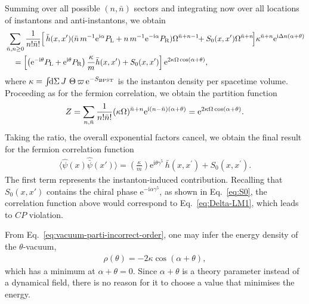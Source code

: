 \documentclass[review]{elsarticle}
\numberwithin{equation}{section}
\numberwithin{table}{section}
\numberwithin{figure}{section}
\def\i{\mathrm{i}}
\def\e{\mathrm{e}}
\begin{document}
Summing over all possible $(n,\bar n)$ sectors and integrating now over all locations of instantons and anti-instantons, we obtain 
\begin{align}
    &\sum\limits_{\bar n,n\geq 0}\frac{1}{n!\bar n!} \Big[ {\,\bar h(x,x^\prime)}(\bar n\, m^{-1} {\rm e}^{{\rm i}\alpha} P_{\rm L}+n\, m^{-1} {\rm e}^{-{\rm i}\alpha} P_{\rm R}) \Omega^{\bar n+n -1} \!\!+ S_{0}(x,x^\prime) \Omega^{\bar n+n}\! \Big] \kappa^{\bar n +n} {\rm e}^{{\rm i}\Delta n(\alpha + \theta)} \notag\\
    &\quad=\left[\left({\rm e}^{-\i\theta} P_{\rm L}+{\rm e}^{{\rm i}\theta}  P_{\rm R}\right)\frac{  \kappa}{m}\bar h(x,x^\prime) + S_{0}(x,x^\prime)\right]{\rm e}^{2\kappa \Omega\cos(\alpha+\theta)}, 
    \label{eq:fermion-two-point-incorrect-order}
\end{align}
where $\kappa={\textstyle\int}\!{\rm d}\Sigma\,J\,
\,\Theta\,\varpi\,{\rm e}^{-S_{\rm BPST}}
$ is the instanton density per spacetime volume.
Proceeding as for the fermion correlation, we obtain the partition function
\begin{align}
    Z = \sum_{n,\bar n}\frac{1}{n!\bar n!}(\kappa \Omega)^{\bar n+n}{ \rm e}^{{\rm i}  (n-\bar n)(\alpha+\theta)}={\rm e}^{2\kappa \Omega \cos(\alpha+\theta)}. 
    \label{eq:vacuum-parti-incorrect-order}
\end{align}
Taking the ratio, the overall exponential factors cancel, we obtain the final result for the fermion correlation function
\begin{align}
    \langle\hat{\psi}(x)\hat{\bar\psi}(x')\rangle=\left(\frac{\kappa}{m}\right)\e^{\i\theta\gamma^5}\,\bar h(x,x^\prime) + S_{0}(x,x^\prime). 
    \label{eq:correlation-incorrect-order}
\end{align}
The first term represents the instanton-induced contribution. Recalling that $S_0(x,x')$ contains the chiral phase $\e^{-\i\alpha\gamma^5}$, as shown in Eq.~\eqref{eq:S0}, the correlation function above would correspond to Eq.~\eqref{eq:Delta-LM1}, which leads to $CP$ violation.

From Eq.~\eqref{eq:vacuum-parti-incorrect-order}, one may infer the energy density of the $\theta$-vacuum,
\begin{align}
    \rho(\theta) = -2\kappa \cos(\alpha+\theta),
\end{align}
which has a minimum at $\alpha+\theta=0$. Since $\alpha+\theta$ is a theory parameter instead of a dynamical field, there is no reason for it to choose a value that minimises the energy.
\end{document}
